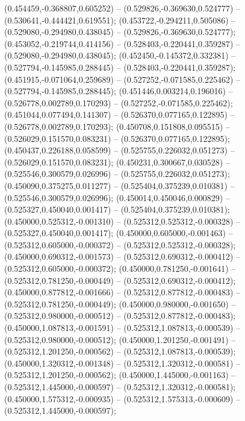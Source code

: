  (0.454459,-0.368807,0.605252) -- (0.529826,-0.369630,0.524777) -- (0.530641,-0.444421,0.619551);
 (0.453722,-0.294211,0.505086) -- (0.529080,-0.294980,0.438045) -- (0.529826,-0.369630,0.524777);
 (0.453052,-0.219744,0.414156) -- (0.528403,-0.220441,0.359287) -- (0.529080,-0.294980,0.438045);
 (0.452450,-0.145372,0.332381) -- (0.527794,-0.145985,0.288445) -- (0.528403,-0.220441,0.359287);
 (0.451915,-0.071064,0.259689) -- (0.527252,-0.071585,0.225462) -- (0.527794,-0.145985,0.288445);
 (0.451446,0.003214,0.196016) -- (0.526778,0.002789,0.170293) -- (0.527252,-0.071585,0.225462);
 (0.451044,0.077494,0.141307) -- (0.526370,0.077165,0.122895) -- (0.526778,0.002789,0.170293);
 (0.450708,0.151808,0.095515) -- (0.526029,0.151570,0.083231) -- (0.526370,0.077165,0.122895);
 (0.450437,0.226188,0.058599) -- (0.525755,0.226032,0.051273) -- (0.526029,0.151570,0.083231);
 (0.450231,0.300667,0.030528) -- (0.525546,0.300579,0.026996) -- (0.525755,0.226032,0.051273);
 (0.450090,0.375275,0.011277) -- (0.525404,0.375239,0.010381) -- (0.525546,0.300579,0.026996);
 (0.450014,0.450046,0.000829) -- (0.525327,0.450040,0.001417) -- (0.525404,0.375239,0.010381);
 (0.450000,0.525312,-0.001310) -- (0.525312,0.525312,-0.000328) -- (0.525327,0.450040,0.001417);
 (0.450000,0.605000,-0.001463) -- (0.525312,0.605000,-0.000372) -- (0.525312,0.525312,-0.000328);
 (0.450000,0.690312,-0.001573) -- (0.525312,0.690312,-0.000412) -- (0.525312,0.605000,-0.000372);
 (0.450000,0.781250,-0.001641) -- (0.525312,0.781250,-0.000449) -- (0.525312,0.690312,-0.000412);
 (0.450000,0.877812,-0.001666) -- (0.525312,0.877812,-0.000483) -- (0.525312,0.781250,-0.000449);
 (0.450000,0.980000,-0.001650) -- (0.525312,0.980000,-0.000512) -- (0.525312,0.877812,-0.000483);
 (0.450000,1.087813,-0.001591) -- (0.525312,1.087813,-0.000539) -- (0.525312,0.980000,-0.000512);
 (0.450000,1.201250,-0.001491) -- (0.525312,1.201250,-0.000562) -- (0.525312,1.087813,-0.000539);
 (0.450000,1.320312,-0.001348) -- (0.525312,1.320312,-0.000581) -- (0.525312,1.201250,-0.000562);
 (0.450000,1.445000,-0.001163) -- (0.525312,1.445000,-0.000597) -- (0.525312,1.320312,-0.000581);
 (0.450000,1.575312,-0.000935) -- (0.525312,1.575313,-0.000609) -- (0.525312,1.445000,-0.000597);

